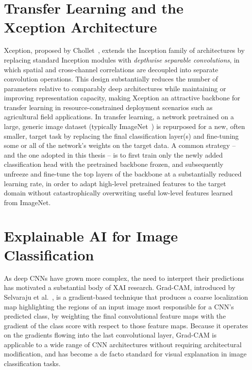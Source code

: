\documentclass[12pt,a4paper,oneside]{report}
\begin{document}
\section{Transfer Learning and the Xception Architecture}
Xception, proposed by Chollet~\cite{chollet2017xception}, extends the Inception family of architectures by
replacing standard Inception modules with \textit{depthwise separable convolutions}, in which spatial and
cross-channel correlations are decoupled into separate convolution operations. This design substantially reduces
the number of parameters relative to comparably deep architectures while maintaining or improving representation
capacity, making Xception an attractive backbone for transfer learning in resource-constrained deployment
scenarios such as agricultural field applications. In transfer learning, a network pretrained on a large, generic
image dataset (typically ImageNet~\cite{deng2009imagenet}) is repurposed for a new, often smaller, target task by
replacing the final classification layer(s) and fine-tuning some or all of the network's weights on the target
data. A common strategy -- and the one adopted in this thesis -- is to first train only the newly added
classification head with the pretrained backbone frozen, and subsequently unfreeze and fine-tune the top layers
of the backbone at a substantially reduced learning rate, in order to adapt high-level pretrained features to the
target domain without catastrophically overwriting useful low-level features learned from ImageNet.

\section{Explainable AI for Image Classification}
As deep CNNs have grown more complex, the need to interpret their predictions has motivated a substantial body
of XAI research. Grad-CAM, introduced by Selvaraju et al.~\cite{selvaraju2017gradcam}, is a gradient-based
technique that produces a coarse localization map highlighting the regions of an input image most responsible
for a CNN's predicted class, by weighting the final convolutional feature maps with the gradient of the
class score with respect to those feature maps. Because it operates on the gradients flowing into the last
convolutional layer, Grad-CAM is applicable to a wide range of CNN architectures without requiring architectural
modification, and has become a de facto standard for visual explanation in image classification tasks.
\end{document}
